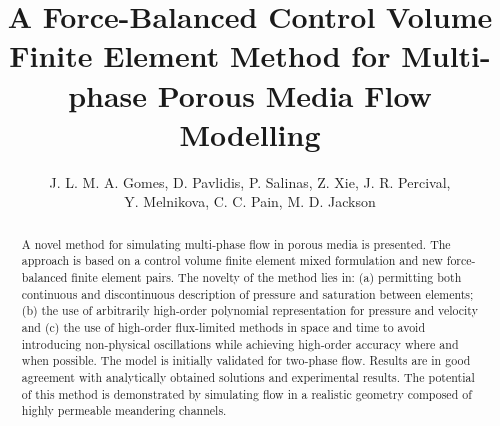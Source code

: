 \documentclass[times]{fldauth}
\begin{document}
\address{ Novel Reservoir Modelling and Simulation Group, Department of Earth Science and Engineering, Imperial College London, UK. \\ Applied Modelling and Computation Group, Department of Earth Science and Engineering, Imperial College London, UK. \\  Environmental and Industrial Fluid Mechanics Group, School of Engineering, University of Aberdeen, UK.}


\title{A Force-Balanced Control Volume Finite Element Method for Multi-phase Porous Media Flow Modelling}


\author{J. L. M. A. Gomes, D. Pavlidis\corrauth{}, P. Salinas, Z. Xie, J. R. Percival, \\Y. Melnikova, C. C. Pain, M. D. Jackson}


\begin{abstract}
  A novel method for simulating multi-phase flow in porous media is
  presented. The approach is based on a control volume finite element
  mixed formulation and new force-balanced finite element pairs. The
  novelty of the method lies in: (a) permitting both continuous and
  discontinuous description of pressure and saturation between
  elements; (b) the use of arbitrarily high-order polynomial
  representation for pressure and velocity and (c) the use of
  high-order flux-limited methods in space and time to avoid
  introducing non-physical oscillations while achieving high-order
  accuracy where and when possible. The model is initially validated
  for two-phase flow. Results are in good agreement with analytically
  obtained solutions and experimental results. The potential of this
  method is demonstrated by simulating flow in a realistic geometry
  composed of highly permeable meandering channels.
\end{abstract}


\maketitle
\end{document}
